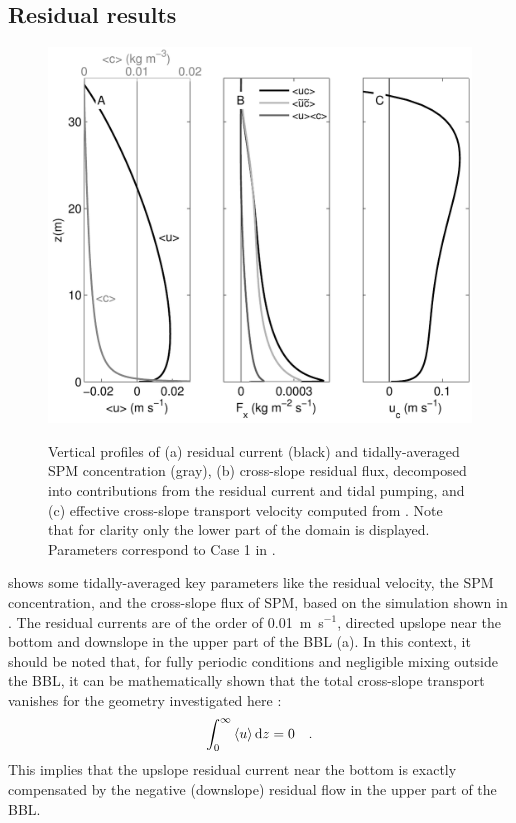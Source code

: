 \subsection{Residual results\label{sec:trans}}
\begin{figure}[h]
  \noindent\includegraphics[width=29pc,angle=0]{bilder/profile.pdf}\\
  \caption{Vertical profiles of (a) residual current (black) and
    tidally-averaged SPM concentration (gray), (b) cross-slope
    residual flux, decomposed into contributions from the residual
    current and tidal pumping, and (c) effective cross-slope transport
    velocity computed from . Note that for clarity only the
    lower part of the domain is displayed. Parameters correspond to
    Case 1 in .}\label{residuals}
\end{figure}
 shows some tidally-averaged key parameters like the
residual velocity, the SPM concentration, and the cross-slope flux of
SPM, based on the simulation shown in . The residual
currents are of the order of 0.01~m~s$^{-1}$, directed upslope near
the bottom and downslope in the upper part of the BBL
(a). In this context, it should be noted that, for
fully periodic conditions and negligible mixing outside the BBL, it
can be mathematically shown that the total cross-slope transport
vanishes for the geometry investigated here
\citep{UmlaufBurchard2011a}:
\begin{equation}
  \label{IntUzero}
   \int_0^\infty \left\langle u \right\rangle \text{d} z = 0 \quad .
\end{equation}
This implies that the upslope residual current near the bottom is
exactly compensated by the negative (downslope) residual flow in the
upper part of the BBL.

